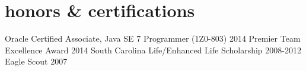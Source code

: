\section{honors \& certifications}
\begin{entrylist}
\honorsentry
{Oracle Certified Associate, Java SE 7 Programmer (1Z0-803)}
{2014}
\honorsentry
{Premier Team Excellence Award}
{2014}
\honorsentry
{South Carolina Life/Enhanced Life Scholarship}
{2008-2012}
\honorsentry
{Eagle Scout}
{2007}
\end{entrylist}
